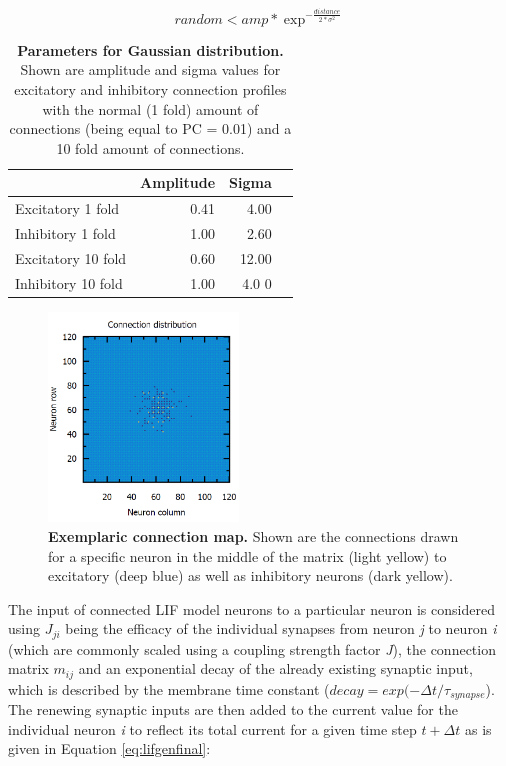 \documentclass[14pt]{SelfArx} %
\numberwithin{equation}{section}
\begin{document}
\newline
\begin{equation}
\label{eq:gauss}
random < amp * \exp^{-\frac{distance}{2*\sigma^{2}}}
\end{equation}
\begin{table}[htb]
\centering
\caption{\textbf{Parameters for Gaussian distribution.} Shown are amplitude and sigma values for excitatory and inhibitory connection profiles with the normal (1 fold) amount of connections (being equal to PC = 0.01) and a 10 fold amount of connections.}
\label{tab:ampsigs}
\begin{tabular}{|l|r|r|r|}
\hline
                   & Amplitude & Sigma \\ \hline
Excitatory 1 fold  & 0.41      & 4.00   \\ \hline
Inhibitory 1 fold  & 1.00       & 2.60    \\ \hline
Excitatory 10 fold & 0.60       & 12.00     \\ \hline
Inhibitory 10 fold & 1.00      & 4.0 0   \\ \hline
\end{tabular}
\end{table}
\begin{figure} [htp]
\centering
\includegraphics[width = 0.45\textwidth]{connmap.png}
\caption{\textbf{Exemplaric connection map.} Shown are the connections drawn for a specific neuron in the middle of the matrix (light yellow) to excitatory  (deep blue) as well as inhibitory neurons (dark yellow).}
\label{fig:connmap}
\end{figure}
\newline
The input of connected LIF model neurons to a particular neuron is considered using $J_{ji}$ being the efficacy of the individual synapses from neuron \textit{j} to neuron \textit{i} (which are commonly scaled using a coupling strength factor \textit{J}), the connection matrix $m_{ij}$ and an exponential decay of the already existing synaptic input, which is described by the membrane time constant ($decay = exp(-\Delta t/\tau _{synapse}$). The renewing synaptic inputs are then added to the current value for the individual neuron \textit{i} to reflect its total current for a given time step $t+\Delta t$ as is given in Equation \ref{eq:lifgenfinal}: \\
\end{document}
